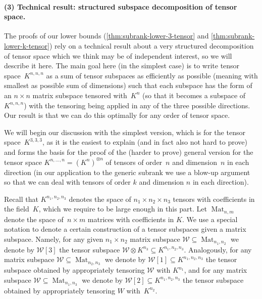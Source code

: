 \documentclass[11pt]{article}
\theoremstyle{definition}
\theoremstyle{remark}
\newcommand{\Mat}{\operatorname{Mat}}
\begin{document}
\paragraph{(3) Technical result: structured subspace decomposition of tensor space.}

The proofs of our lower bounds (\autoref{thm:subrank-lower-3-tensor} and \autoref{thm:subrank-lower-k-tensor}) rely on a technical result about a very structured decomposition of tensor space which we think may be of independent interest, so we will describe it here. The main goal here (in the simplest case) is to write tensor space~$K^{n, n, n}$ as a sum of tensor subspaces as efficiently as possible (meaning with smallest as possible sum of dimensions) such that each subspace has the form of an $n \times n$ matrix subspace tensored with~$K^n$ (so that it becomes a subspace of $K^{n,n,n}$) with the tensoring being applied in any of the three possible directions. Our result is that we can do this optimally for any order of tensor space.

We will begin our discussion with the simplest version, which is for the tensor space~$K^{3,3,3}$, as it is the easiest to explain (and in fact also not hard to prove) and forms the basis for the proof of the (harder to prove) general version for the tensor space $K^{n,\ldots, n} = (K^n)^{\otimes n}$ of tensors of order~$n$ and dimension~$n$ in each direction (in our application to the generic subrank we use a blow-up argument so that we can deal with tensors of order $k$ and dimension $n$ in each direction). 

Recall that $K^{n_1, n_2, n_3}$ denotes the space of $n_1 \times n_2 \times n_3$ tensors with coefficients in the field~$K$, which we require to be large enough in this part. Let $\Mat_{n,m}$ denote the space of~$n \times m$ matrices with coefficients in $K$.
We use a special notation to denote a certain construction of a tensor subspaces given a matrix subspace. Namely, for any given $n_1 \times n_2$ matrix subspace $\mathcal{W} \subseteq \Mat_{n_1, n_2}$ we denote by $\mathcal{W}[3]$ the tensor subspace $\mathcal{W} \otimes K^{n_3} \subseteq K^{n_1, n_2, n_3}$. Analogously, for any matrix subspace $\mathcal{W} \subseteq \Mat_{n_2, n_3}$ we denote by $\mathcal{W}[1] \subseteq K^{n_1, n_2, n_3}$ the tensor subspace obtained by appropriately tensoring $\mathcal{W}$ with $K^{n_1}$, and for any matrix subspace $\mathcal{W} \subseteq \Mat_{n_1, n_3}$ we denote by $\mathcal{W}[2] \subseteq K^{n_1, n_2, n_3}$ the tensor subspace obtained by appropriately tensoring $W$ with~$K^{n_2}$.
\end{document}
